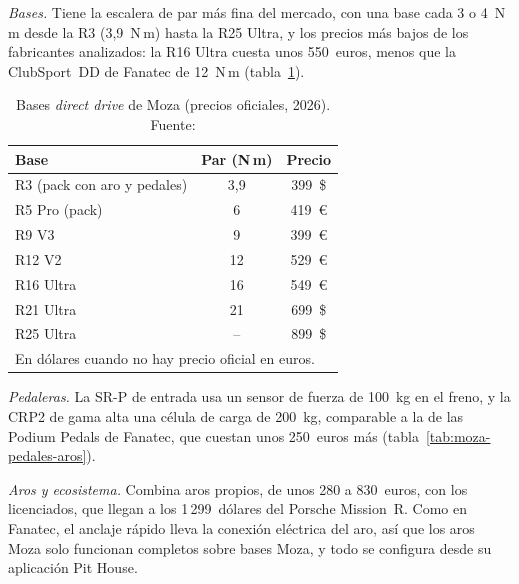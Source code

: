 \textit{Bases.} Tiene la escalera de par más fina del mercado, con una base cada 3 o 4~N\,m desde la R3 (3,9~N\,m) hasta la R25 Ultra, y los precios más bajos de los fabricantes analizados: la R16 Ultra cuesta unos 550~euros, menos que la ClubSport~DD de Fanatec de 12~N\,m \parencite{moza_web} (tabla~\ref{tab:moza}).

\begin{table}[htbp]
	\centering
	\caption[Bases \textit{direct drive} de Moza (precios oficiales, 2026)]{Bases \textit{direct drive} de Moza (precios oficiales, 2026). Fuente: \parencite{moza_web}}
	\label{tab:moza}
	\small
	\begin{tabular}{|l|c|c|}
		\hline
		\textbf{Base} & \textbf{Par (N\,m)} & \textbf{Precio} \\
		\hline
		R3 (pack con aro y pedales)  & 3,9 & 399~\$ \\
		R5 Pro (pack)                & 6   & 419~\euro \\
		R9 V3                        & 9   & 399~\euro \\
		R12 V2                       & 12  & 529~\euro \\
		R16 Ultra                    & 16  & 549~\euro \\
		R21 Ultra                    & 21  & 699~\$ \\
		R25 Ultra                    & --  & 899~\$ \\
		\hline
		\multicolumn{3}{l}{\footnotesize En dólares cuando no hay precio oficial en euros.} \\
	\end{tabular}
\end{table}

\textit{Pedaleras.} La SR-P de entrada usa un sensor de fuerza de 100~kg en el freno, y la CRP2 de gama alta una célula de carga de 200~kg, comparable a la de las Podium Pedals de Fanatec, que cuestan unos 250~euros más \parencite{moza_web} (tabla~\ref{tab:moza-pedales-aros}).

\textit{Aros y ecosistema.} Combina aros propios, de unos 280 a 830~euros, con los licenciados, que llegan a los 1\,299~dólares del Porsche Mission~R. Como en Fanatec, el anclaje rápido lleva la conexión eléctrica del aro, así que los aros Moza solo funcionan completos sobre bases Moza, y todo se configura desde su aplicación Pit House.

